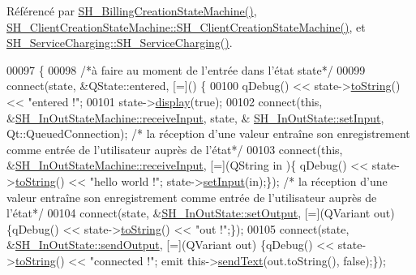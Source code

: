 Référencé par \hyperlink{classSH__BillingCreationStateMachine_ad62b77fa4aeafe200056ff3974562f83}{S\-H\-\_\-\-Billing\-Creation\-State\-Machine()}, \hyperlink{classSH__ClientCreationStateMachine_a0b406b0f404c0fd33bf35be8ce0cc811}{S\-H\-\_\-\-Client\-Creation\-State\-Machine\-::\-S\-H\-\_\-\-Client\-Creation\-State\-Machine()}, et \hyperlink{classSH__ServiceCharging_afa5273d046049b1c2b020a6a19a8290b}{S\-H\-\_\-\-Service\-Charging\-::\-S\-H\-\_\-\-Service\-Charging()}.


\begin{DoxyCode}
00097 \{
00098     \textcolor{comment}{/*à faire au moment de l'entrée dans l'état state*/}
00099     connect(state, &QState::entered, [=]() \{
00100         qDebug() << state->\hyperlink{classSH__GenericState_a7779babbb40f3f8faa71112204d9804f}{toString}() << \textcolor{stringliteral}{"entered !"};
00101         state->\hyperlink{classSH__InOutState_a616f88b20478b81b2927a9ddc2b4f521}{display}(\textcolor{keyword}{true});
00102         connect(\textcolor{keyword}{this}, &\hyperlink{classSH__InOutStateMachine_a037ed5e13ecfae2123a8d4940292e410}{SH\_InOutStateMachine::receiveInput}, state, &
      \hyperlink{classSH__InOutState_aaec9c2b5ef7c406bff7469461352d47c}{SH\_InOutState::setInput}, Qt::QueuedConnection); \textcolor{comment}{/* la réception d'une valeur
       entraîne son enregistrement comme entrée de l'utilisateur auprès de l'état*/}
00103         connect(\textcolor{keyword}{this}, &\hyperlink{classSH__InOutStateMachine_a037ed5e13ecfae2123a8d4940292e410}{SH\_InOutStateMachine::receiveInput}, [=](QString in
      )\{ qDebug() << state->\hyperlink{classSH__GenericState_a7779babbb40f3f8faa71112204d9804f}{toString}() << \textcolor{stringliteral}{"hello world !"}; state->\hyperlink{classSH__InOutState_aaec9c2b5ef7c406bff7469461352d47c}{setInput}(in);\}); \textcolor{comment}{/* la réception
       d'une valeur entraîne son enregistrement comme entrée de l'utilisateur auprès de l'état*/}
00104         connect(state, &\hyperlink{classSH__InOutState_af611c84134e262739cd834797b315c80}{SH\_InOutState::setOutput}, [=](QVariant out) \{qDebug() << 
      state->\hyperlink{classSH__GenericState_a7779babbb40f3f8faa71112204d9804f}{toString}() << \textcolor{stringliteral}{"out !"};\});
00105         connect(state, &\hyperlink{classSH__InOutState_a77921c5f42059bc97361f4ff7827da12}{SH\_InOutState::sendOutput}, [=](QVariant out) \{qDebug() << 
      state->\hyperlink{classSH__GenericState_a7779babbb40f3f8faa71112204d9804f}{toString}() << \textcolor{stringliteral}{"connected !"}; emit this->\hyperlink{classSH__InOutStateMachine_a5e7f5958bae31696b6a8deab94ad2b4f}{sendText}(out.toString(), \textcolor{keyword}{false});\});

\end{DoxyCode}
